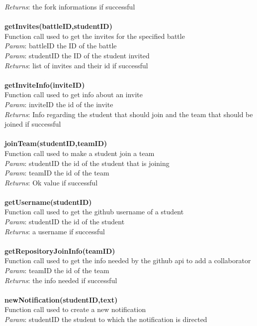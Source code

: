 \documentclass{article}
\begin{document}
\textit{Returns}: the fork informations if successful\\
\\
\textbf{getInvites(battleID,studentID)}\\
Function call used to get the invites for the specified battle\\
\textit{Param}: battleID the ID of the battle\\
\textit{Param}: studentID the ID of the student invited\\
\textit{Returns}: list of invites and their id if successful\\
\\
\textbf{getInviteInfo(inviteID)}\\
Function call used to get info about an invite\\
\textit{Param}: inviteID the id of the invite\\
\textit{Returns}: Info regarding the student that should join and the team that should be joined if successful\\
\\
\textbf{joinTeam(studentID,teamID)}\\
Function call used to make a student join a team\\
\textit{Param}: studentID the id of the student that is joining\\
\textit{Param}: teamID the id of the team\\
\textit{Returns}: Ok value if successful\\
\\
\textbf{getUsername(studentID)}\\
Function call used to get the github username of a student\\
\textit{Param}: studentID the id of the student\\
\textit{Returns}: a username if successful\\
\\
\textbf{getRepositoryJoinInfo(teamID)}\\
Function call used to get the info needed by the github api to add a collaborator\\
\textit{Param}: teamID the id of the team\\
\textit{Returns}: the info needed if successful\\
\\
\textbf{newNotification(studentID,text)}\\
Function call used to create a new notification\\
\textit{Param}: studentID the student to which the notification is directed\\
\end{document}
